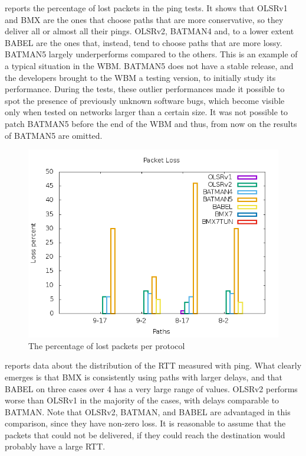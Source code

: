 \documentclass[10pt,onecolumn]{paper}
\begin{document}
 reports the percentage of lost packets in the ping tests. It
shows that OLSRv1 and BMX are the ones that choose paths that are more
conservative, so they deliver all or almost all their pings. OLSRv2, BATMAN4
and, to a lower extent BABEL are the ones that, instead, tend to choose paths
that are more lossy. BATMAN5 largely underperforms compared to the others. This
is an example of a typical situation in the WBM. BATMAN5 does not have a stable
release, and the developers brought to the WBM a testing version, to initially
study its performance. During the tests, these outlier performances made it
possible to spot the presence of previously unknown software bugs, which become
visible only when tested on networks larger than a certain size. 
It was not possible to patch BATMAN5 before the end of the WBM and thus, from
now on the results of BATMAN5 are omitted. 

\begin{figure}[!htb]
  \centering
  \includegraphics[width=.9\linewidth]{images/failure_test_loss-IPv6.png}
  \caption{The percentage of lost packets per protocol}
    \label{fig:pingloss}
\end{figure}

 reports data about the distribution of the RTT measured
with ping. What clearly emerges is that BMX is consistently using paths with
larger delays, and that BABEL on three cases over 4 has a very large range of
values. OLSRv2 performs worse than OLSRv1 in the majority of the cases, with
delays comparable to BATMAN. Note that OLSRv2, BATMAN, and BABEL are advantaged
in this comparison, since they have non-zero loss. It is reasonable to assume
that the packets that could not be delivered, if they could reach the
destination would probably have a large RTT.
\end{document}
